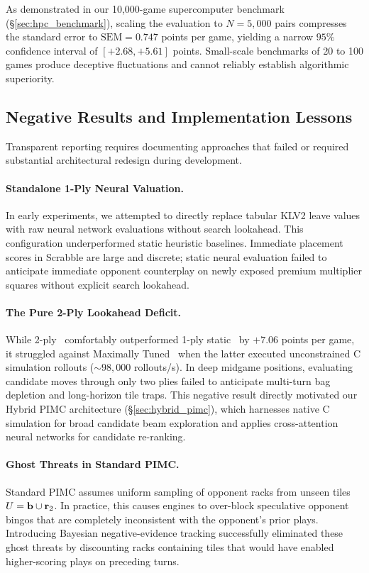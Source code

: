 As demonstrated in our 10,000-game supercomputer benchmark (\S\ref{sec:hpc_benchmark}), scaling the evaluation to $N = 5,000$ pairs compresses the standard error to $\mathrm{SEM} = 0.747$ points per game, yielding a narrow $95\%$ confidence interval of $[+2.68, +5.61]$ points. Small-scale benchmarks of 20 to 100 games produce deceptive fluctuations and cannot reliably establish algorithmic superiority.

\subsection{Negative Results and Implementation Lessons}

Transparent reporting requires documenting approaches that failed or required substantial architectural redesign during development.

\paragraph{Standalone 1-Ply Neural Valuation.} In early experiments, we attempted to directly replace tabular KLV2 leave values with raw neural network evaluations without search lookahead. This configuration underperformed static heuristic baselines. Immediate placement scores in Scrabble are large and discrete; static neural evaluation failed to anticipate immediate opponent counterplay on newly exposed premium multiplier squares without explicit search lookahead.

\paragraph{The Pure 2-Ply Lookahead Deficit.} While 2-ply \bams\ comfortably outperformed 1-ply static \magpie\ by $+7.06$ points per game, it struggled against Maximally Tuned \magpie\ when the latter executed unconstrained C simulation rollouts ($\sim 98,000$ rollouts/s). In deep midgame positions, evaluating candidate moves through only two plies failed to anticipate multi-turn bag depletion and long-horizon tile traps. This negative result directly motivated our Hybrid PIMC architecture (\S\ref{sec:hybrid_pimc}), which harnesses native C simulation for broad candidate beam exploration and applies cross-attention neural networks for candidate re-ranking.

\paragraph{Ghost Threats in Standard PIMC.} Standard PIMC assumes uniform sampling of opponent racks from unseen tiles $U = \mathbf{b} \cup \mathbf{r}_2$. In practice, this causes engines to over-block speculative opponent bingos that are completely inconsistent with the opponent's prior plays. Introducing Bayesian negative-evidence tracking successfully eliminated these ghost threats by discounting racks containing tiles that would have enabled higher-scoring plays on preceding turns.

